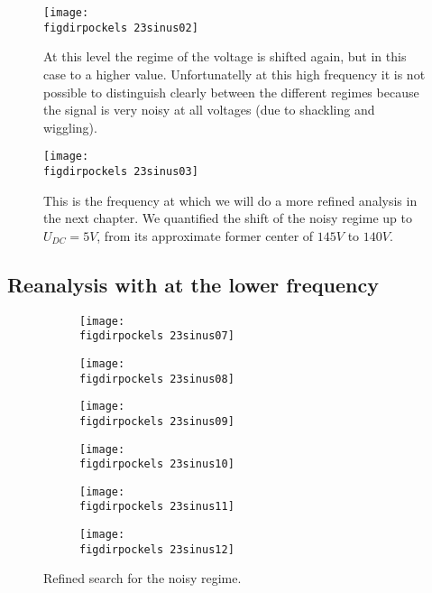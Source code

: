 \begin{figure}
    \texttt{[image: \\figdirpockels 23sinus02]}
    \caption{At this level the regime of the voltage is shifted
        again, but in this case to a higher value. Unfortunatelly
        at this high frequency it is not possible to distinguish
        clearly between the different regimes because the signal
        is very noisy at all voltages (due to shackling 
            and wiggling).}
\end{figure}

\begin{figure}
    \texttt{[image: \\figdirpockels 23sinus03]}
    \caption{This is the frequency at which we will do a more
        refined analysis in the next chapter. We quantified the
        shift of the noisy regime up to $U_{DC}=5V$, from
        its approximate former center of $145V$ to $140V$.}
\end{figure}
\clearpage
\subsection{Reanalysis with at the lower frequency}
\begin{figure}
    \begin{subfigure}[b]{\picwidth}
        \texttt{[image: \\figdirpockels 23sinus07]}
        \caption{}
    \end{subfigure}\qquad
    \begin{subfigure}[b]{\picwidth}
        \texttt{[image: \\figdirpockels 23sinus08]}
        \caption{}
    \end{subfigure}
    \begin{subfigure}[b]{\picwidth}
        \texttt{[image: \\figdirpockels 23sinus09]}
        \caption{}
    \end{subfigure}
    \begin{subfigure}[b]{\picwidth}
        \texttt{[image: \\figdirpockels 23sinus10]}
        \caption{}
    \end{subfigure}
    \begin{subfigure}[b]{\picwidth}
        \texttt{[image: \\figdirpockels 23sinus11]}
        \caption{}
    \end{subfigure}
    \begin{subfigure}[b]{\picwidth}
        \texttt{[image: \\figdirpockels 23sinus12]}
        \caption{}
    \end{subfigure}
    \caption{Refined search for the noisy regime.}
    \label{fig:sinus5}
\end{figure}


